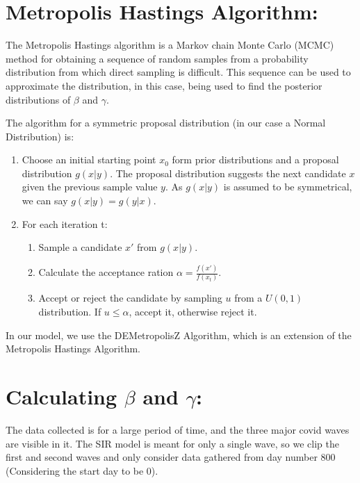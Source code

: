 \documentclass[letterpaper,12pt]{report}
\begin{document}
\section*{\large Metropolis Hastings Algorithm:} \vspace{-10pt}
The Metropolis Hastings algorithm is a Markov chain Monte Carlo (MCMC) method for obtaining a sequence of random samples from a probability distribution from which direct sampling is difficult. This sequence can be used to approximate the distribution, in this case, being used to find the posterior distributions of $\beta$ and $\gamma$. \\ \vspace{-5pt}

\noindent
The algorithm for a symmetric proposal distribution (in our case a Normal Distribution) is: \vspace{-5pt}
\begin{enumerate}
    \item Choose an initial starting point $x_0$ form prior distributions and a proposal distribution $g(x | y)$. The proposal distribution suggests the next candidate $x$ given the previous sample value $y$. As $g(x | y)$ is assumed to be symmetrical, we can say $g(x | y) = g(y | x)$. \vspace{-5pt}
    \item For each iteration t: \vspace{-5pt}
    \begin{enumerate}
        \item Sample a candidate $x'$ from $g(x|y)$. \vspace{-2pt}
        \item Calculate the acceptance ration $\alpha = \frac{f(x')}{f(x_t)}$. \vspace{-2pt}
        \item Accept or reject the candidate by sampling $u$ from a $U(0, 1)$ distribution. If $u \leq \alpha$, accept it, otherwise reject it.  
    \end{enumerate}
\end{enumerate} \vspace{-5pt}

\noindent
In our model, we use the DEMetropolisZ Algorithm, which is an extension of the Metropolis Hastings Algorithm.
\vspace{-10pt}

\section*{\large Calculating $\beta$ and $\gamma$:}\vspace{-10pt}
The data collected is for a large period of time, and the three major covid waves are visible in it. The SIR model is meant for only a single wave, so we clip the first and second waves and only consider data gathered from day number 800 (Considering the start day to be 0).
\end{document}
